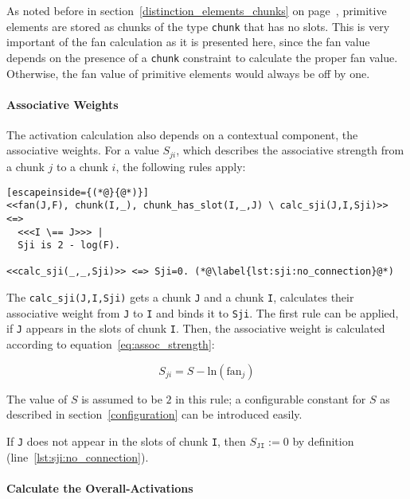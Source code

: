 As noted before in section~\ref{distinction_elements_chunks} on page~\pageref{distinction_elements_chunks}, primitive elements are stored as chunks of the type \lstinline|chunk| that has no slots. This is very important of the fan calculation as it is presented here, since the fan value depends on the presence of a \lstinline|chunk| constraint to calculate the proper fan value. Otherwise, the fan value of primitive elements would always be off by one.

\paragraph{Associative Weights}

The activation calculation also depends on a contextual component, the associative weights. For a value $S_{ji}$, which describes the associative strength from a chunk $j$ to a chunk $i$, the following rules apply:

\begin{lstlisting}[escapeinside={(*@}{@*)}]
<<fan(J,F), chunk(I,_), chunk_has_slot(I,_,J) \ calc_sji(J,I,Sji)>> <=> 
  <<<I \== J>>> | 
  Sji is 2 - log(F).

<<calc_sji(_,_,Sji)>> <=> Sji=0. (*@\label{lst:sji:no_connection}@*)
\end{lstlisting}

The \lstinline|calc_sji(J,I,Sji)| gets a chunk \lstinline|J| and a chunk \lstinline|I|, calculates their associative weight from \lstinline|J| to \lstinline|I| and binds it to \lstinline|Sji|. The first rule can be applied, if \lstinline|J| appears in the slots of chunk \lstinline|I|. Then, the associative weight is calculated according to equation~\eqref{eq:assoc_strength}:

\begin{equation*}
S_{ji} = S - \mathrm{ln}(\mathrm{fan}_j) 
\end{equation*}

The value of $S$ is assumed to be $2$ in this rule; a configurable constant for $S$ as described in section~\ref{configuration} can be introduced easily.

If \lstinline|J| does not appear in the slots of chunk \lstinline|I|, then $S_{\mathtt{JI}} := 0$ by definition (line~\ref{lst:sji:no_connection}).

\paragraph{Calculate the Overall-Activations}

